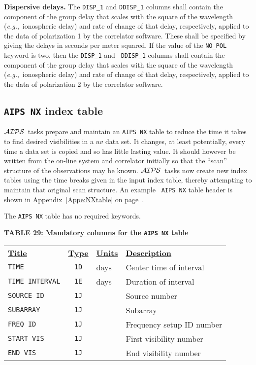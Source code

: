 \documentclass[twoside]{article}
\newcommand{\AIPS}{{$\cal AIPS\/$}}
\newcommand{\eg}{{\it e.g.},}
\begin{document}
{\bf Dispersive delays.}  The {\tt DISP\_1} and  {\tt DDISP\_1}
columns shall contain the component of the group delay that scales
with the square of the wavelength (\eg\ ionospheric delay) and rate of
change of that delay, respectively, applied to the data of
polarization 1 by the correlator software.  These shall be specified
by giving the delays in seconds per meter squared.  If the value of the
{\tt NO\_POL} keyword is two, then the {\tt DISP\_1} and  {\tt
  DDISP\_1} columns shall contain the component of the group delay
that scales with the square of the wavelength (\eg\ ionospheric delay)
and rate of change of that delay, respectively, applied to the data of
polarization 2 by the correlator software.

\subsection{{\tt AIPS NX} index table}
\label{s:NX}

\AIPS\ tasks prepare and maintain an {\tt AIPS NX} table to reduce the
time it takes to find desired visibilities in a $uv$ data set.  It
changes, at least potentially, every time a data set is copied and so
has little lasting value.  It should however be written from the
on-line system and correlator initially so that the ``scan'' structure
of the observations may be known.  \AIPS\ tasks now create new index
tables using the time breaks given in the input index table, thereby
attempting to maintain that original scan structure.  An example {\tt
  AIPS NX} table header is shown in Appendix~\ref{Appe:NXtable} on
page~\pageref{Appe:NXtable}.

The {\tt AIPS NX} table has no required keywords.

\begin{center}
\underline{\bf{TABLE 29: Mandatory columns for the {\tt AIPS NX} table}}\\
\begin{tabular}{lcll}
\noalign{\vspace{2pt}} \label{ta:NXcols}
\underline{{\bf Title\vphantom{y}}} & \underline{\bf{Type}} &
   \underline{{\bf Units\vphantom{y}}} & \underline{\bf{Description}} \\
\noalign{\vspace{2pt}}
{\tt TIME}          & {\tt 1D} & days & Center time of interval \\
{\tt TIME INTERVAL} & {\tt 1E} & days & Duration of interval \\
{\tt SOURCE ID}     & {\tt 1J} &      & Source number \\
{\tt SUBARRAY}      & {\tt 1J} &      & Subarray \\
{\tt FREQ ID}       & {\tt 1J} &      & Frequency setup ID number \\
{\tt START VIS}     & {\tt 1J} &      & First visibility number \\
{\tt END VIS}       & {\tt 1J} &      & End visibility number
\end{tabular}
\end{center}
\end{document}

